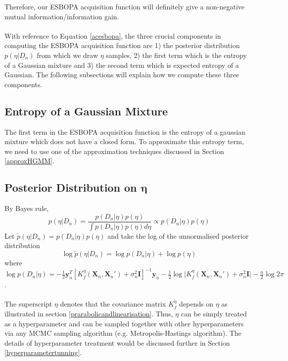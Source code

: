 \documentclass[a4paper,11pt]{report}
\begin{document}
Therefore, our ESBOPA acquisition function will definitely give a non-negative mutual information/information gain. 
\\\\ \noindent
With reference to Equation \ref{acesbopa}, the three crucial components in computing the ESBOPA acquisition function are 1) the posterior distribution $p(\eta \vert D_n)$ from which we draw $\eta$ samples, 2) the first term which is the entropy of a Gaussian mixture and 3) the second term which is expected entropy of a Gaussian. The following subsections will explain how we compute these three components. 

\subsection{Entropy of a Gaussian Mixture}
The first term in the ESBOPA acquisition function is the entropy of a gaussian mixture which does not have a closed form. To approximate this entropy term, we need to use one of the approximation techniques discussed in Section \ref{approxHGMM}. 

\subsection{ Posterior Distribution on $ \boldsymbol{\eta}$ } 
By Bayes rule, 
\[ p(\eta \vert D_n)=\frac{p(D_n \vert \eta) p( \eta ) } {\int p(D_n \vert \eta) p( \eta ) d\eta} \propto p(D_n \vert \eta) p( \eta ) \]
Let $ \tilde p(\eta \vert D_n)=p(D_n \vert \eta) p( \eta ) $ and take the log of the unnormalised posterior distribution 
	\begin{equation} 
	\log \tilde p(\eta \vert D_n) = \log p(D_n \vert \eta)  + \log p( \eta ) 
	\end{equation}
where $\log p(D_n \vert \eta) = -\frac{1}{2} \mathbf{y}_n^T [K^{\eta}_{f} (\mathbf{X}_n,\mathbf{X}_n') + \sigma_{n}^2 \mathbf{I} ]^{-1} \mathbf{y}_n - \frac{1}{2} \log \vert  K^{\eta}_{f} (\mathbf{X}_n,\mathbf{X}_n') + \sigma_{n}^2 \mathbf{I}\vert - \frac{n}{2} \log 2\pi $ \cite{rasmussen2006gaussian}. 
\\\\ \noindent
The superscript $\eta$ denotes that the covariance matrix $K^{\eta}_{f}$ depends on $\eta$ as illustrated in section \ref{prarabolicandlinearisation}. Thus, $\eta$ can be simply treated as a hyperparameter and can be sampled together with other hyperparameters via any MCMC sampling algorithm (e.g. Metropolis-Hastings algorithm). The details of hyperparameter treatment would be discussed further in Section \ref{hyperparametertunning}. 
\end{document}

